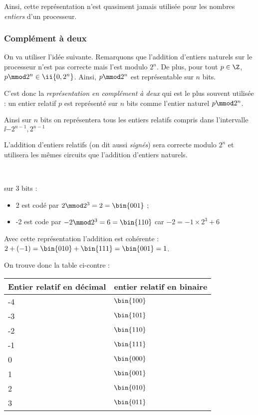 Ainsi, cette représentation n'est quasiment jamais utilisée pour les nombres
\emph{entiers} d'un processeur.
\subsubsection{Complément à deux}

On va utiliser l'idée suivante. Remarquons que l'addition d'entiers naturels sur le processeur n'est pas correcte mais l'est modulo $2^{n}$. De plus, pour tout $p\in \Z$, $p\mmod 2^{n} \in \ii{0,2^{n}}$. 
  Ainsi, $p\mmod 2^{n}$ est représentable sur $n$ bits.
  
C'est donc la \emph{représentation en complément à deux} qui est le plus souvent utilisée : un entier relatif $p$ est représenté sur $n$ bits comme l'entier naturel $p\mmod 2^n$. 

Ainsi sur $n$ bits on représentera tous les entiers relatifs compris dans l'intervalle  $\ii{-2^{n-1},2^{n-1}}$

\begin{rem}
  L'addition d'entiers relatifs (on dit aussi \emph{signés}) sera correcte modulo $2^{n}$ et utilisera les mêmes circuits que l'addition d'entiers naturels.
\end{rem}

\begin{exemple} ~\\

\begin{minipage}{0.4\textwidth}
sur 3 bits :
\begin{itemize}
\item  2 est codé par $2\mmod 2^3=2=\bin{001}$ ;
\item -2 est code par $-2\mmod 2^3=6=\bin{110}$ car $-2=-1\times 2^3+6$ 
\end{itemize}

\item Avec cette représentation l'addition est cohérente : $2+(-1)=\bin{010}+\bin{111}=\bin{001}=1$.

On trouve donc la table ci-contre : 
\end{minipage}
\begin{minipage}{0.4\textwidth}

\begin{tabular}{|p{}|p{}|}
\hline 
Entier relatif en décimal & entier relatif en binaire \\ 
\hline 
-4 & $\bin{100}$ \\ 
\hline 
-3 & $\bin{101}$ \\ 
\hline 
-2 & $\bin{110}$ \\ 
\hline 
-1 & $\bin{111}$ \\ 
\hline 
0 & $\bin{000}$ \\ 
\hline 
1 & $\bin{001}$ \\ 
\hline 
2 & $\bin{010}$ \\ 
\hline 
3 & $\bin{011}$ \\ 
\hline 
\end{tabular} 
\end{minipage}

\end{exemple}


